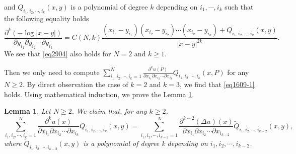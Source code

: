 \documentclass[11pt,reqno]{article}
\newtheorem{lemma}[teo]{Lemma}
\numberwithin{equation}{section}
\begin{document}
                   and  $Q_{i_1,i_2,\cdots,i_k}(x,y)$ is a polynomial of degree $k$ depending on $i_1,\cdots,i_k$ such that the following equality holds
                	\begin{equation}\label{eq2206-1}
					\frac{\partial^k(-\log|x-y|)}{\partial y_{i_1} \partial y_{i_2}\cdots \partial y_{i_k}}=C(N,k)\frac{(x_{i_1}-y_{i_1})(x_{i_2}-y_{i_2})\cdots (x_{i_k}-y_{i_k})+Q_{i_1,i_2,\cdots,i_k}(x,y)}
					{|x-y|^{2k}}.
				\end{equation}
              We see that   \eqref{eq2904} also holds for $N=2$ and $k\ge 1$.
              
      Then we only need to compute $\sum_{i_1,i_2,\cdots,i_k=1}^{N}\frac{\partial^k u(P)}{\partial x_{i_1} \partial x_{i_2}\cdots \partial x_{i_k}}Q_{i_1,i_2,\cdots,i_k}(x,P)$ for any $N\ge 2$. By direct observation the case of $k=2$ and $k=3$, we find that \eqref{eq1609-1} holds.
    Using mathematical induction, we prove the  Lemma \ref{lem10102025-1}.
       \begin{lemma}\label{lem10102025-1}
             Let $N\ge 2$.   We claim that, for any  $k\ge2$,
					\begin{equation}\label{eq1609-1}
						\sum_{i_1,i_2,\cdots,i_k=1}^{N}\frac{\partial^k u(x)}{\partial x_{i_1} \partial x_{i_2}\cdots \partial x_{i_k}}Q_{i_1,i_2,\cdots,i_k}(x,y)=	\sum_{i_1,i_2,\cdots,i_{k-2}=1}^{N}\frac{\partial^{k-2}(\Delta u) (x)}{\partial x_{i_1} \partial x_{i_2}\cdots \partial x_{i_{k-2}}} \widetilde{Q}_{i_1,i_2,\cdots,i_{k-2}}(x,y),
					\end{equation}
					where $\widetilde{Q}_{i_1,i_2,\cdots,i_{k-2}}(x,y)$ is a polynomial of degree k depending on $i_1,i_2,\cdots,i_{k-2}$.
            \end{lemma}
\end{document}
